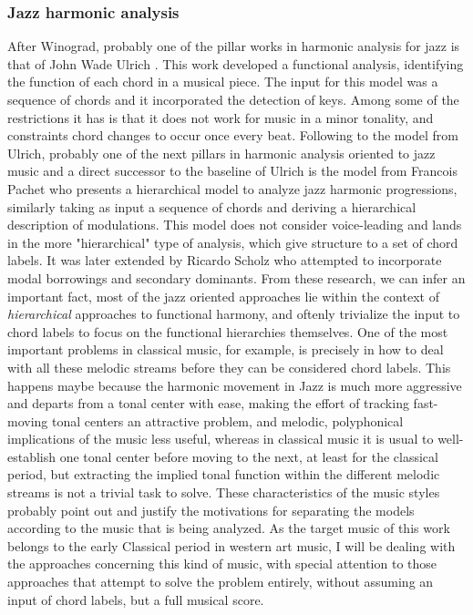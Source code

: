     \subsubsection{Jazz harmonic analysis}
    After Winograd, probably one of the pillar works in harmonic analysis for jazz is that of John Wade Ulrich \cite{ulrich1977analysis}. This work developed a functional analysis, identifying the function of each chord in a musical piece. The input for this model was a sequence of chords and it incorporated the detection of keys. Among some of the restrictions it has is that it does not work for music in a minor tonality, and constraints chord changes to occur once every beat.
    Following to the model from Ulrich, probably one of the next pillars in harmonic analysis oriented to jazz music and a direct successor to the baseline of Ulrich is the model from Francois Pachet \cite{pachet2000computer} who presents a hierarchical model to analyze jazz harmonic progressions, similarly taking as input a sequence of chords and deriving a hierarchical description of modulations. This model does not consider voice-leading and lands in the more "hierarchical" type of analysis, which give structure to a set of chord labels. It was later extended by Ricardo Scholz \cite{scholz2005automating} who attempted to incorporate modal borrowings and secondary dominants.
    From these research, we can infer an important fact, most of the jazz oriented approaches lie within the context of \emph{hierarchical} approaches to functional harmony, and oftenly trivialize the input to chord labels to focus on the functional hierarchies themselves. One of the most important problems in classical music, for example, is precisely in how to deal with all these melodic streams before they can be considered chord labels. This happens maybe because the harmonic movement in Jazz is much more aggressive and departs from a tonal center with ease, making the effort of tracking fast-moving tonal centers an attractive problem, and melodic, polyphonical implications of the music less useful, whereas in classical music it is usual to well-establish one tonal center before moving to the next, at least for the classical period, but extracting the implied tonal function within the different melodic streams is not a trivial task to solve. These characteristics of the music styles probably point out and justify the motivations for separating the models according to the music that is being analyzed.
    As the target music of this work belongs to the early Classical period in western art music, I will be dealing with the approaches concerning this kind of music, with special attention to those approaches that attempt to solve the problem entirely, without assuming an input of chord labels, but a full musical score.
